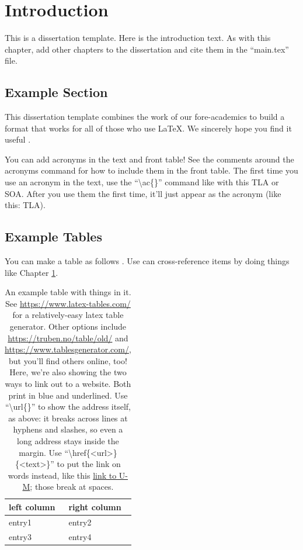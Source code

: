 \chapter{Introduction}
\label{chpt:introduction}

This is a dissertation template. Here is the introduction text. As with this chapter, add other chapters to the dissertation and cite them in the ``main.tex'' file.


\section{Example Section}
\label{sec:examplesec1}

This dissertation template combines the work of our fore-academics to build a format that works for all of those who use \LaTeX \cite{jefferson2019policing}. We sincerely hope you find it useful \cite{shannon1948mathematical}.

You can add acronyms in the text and front table! See the comments around the acronyms command for how to include them in the front table. The first time you use an acronym in the text, use the ``\textbackslash ac\{\}'' command like with this \ac{TLA} or \ac{SOA}. After you use them the first time, it'll just appear as the acronym (like this: \ac{TLA}).

\blindtext


\section{Example Tables}
\label{sec:examplesec2}

You can make a table as follows \cite{ong1997gilbert}. Use can cross-reference items by doing things like Chapter \ref{chpt:introduction}.

\blindtext

\begin{table}[ht]
    \begin{tabular}{l|l}
        \textbf{left column} & \textbf{right column} \\ \hline
        entry1 & entry2 \\
        entry3 & entry4
    \end{tabular}
    \caption{An example table with things in it. See \url{https://www.latex-tables.com/} for a relatively-easy latex table generator. Other options include \url{https://truben.no/table/old/} and \url{https://www.tablesgenerator.com/}, but you'll find others online, too! Here, we're also showing the two ways to link out to a website. Both print in blue and underlined. Use ``\textbackslash url\{\}'' to show the address itself, as above: it breaks across lines at hyphens and slashes, so even a long address stays inside the margin. Use ``\textbackslash href\{\textless url\textgreater\}\{\textless text\textgreater\}'' to put the link on words instead, like this \href{https://umich.edu}{link to U-M}; those break at spaces.}
    \label{tab:my-table}
\end{table}


